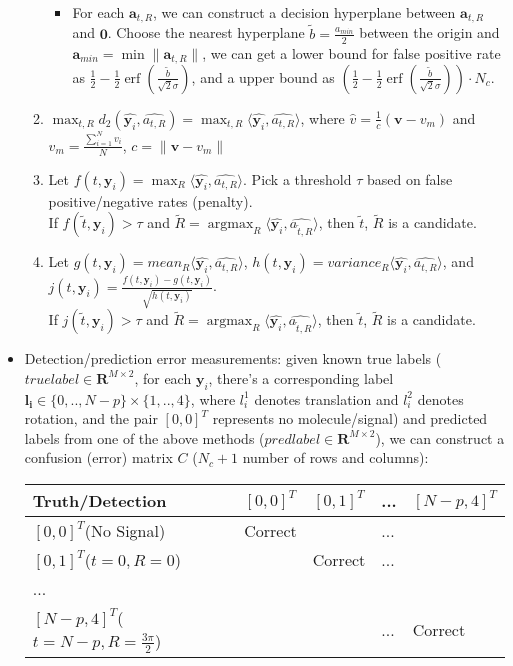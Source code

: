 \documentclass[11pt]{article}
\newcommand{\by}{\boldsymbol{y}}
\DeclareMathOperator*{\argmax}{argmax}
\DeclareMathOperator{\erf}{erf}
\begin{document}
\begin{itemize}
\begin{enumerate}
\begin{itemize}
            \item For each $\mathbf{a}_{t,R}$, we can construct a decision hyperplane between $\mathbf{a}_{t,R}$ and $\mathbf{0}$. Choose the nearest hyperplane $\widetilde{b} = \frac{a_{min}}{2}$ between the origin and $\mathbf{a}_{min} = \min{\lVert  \mathbf{a}_{t,R}\rVert}$, we can get a lower bound for false positive rate as $\frac{1}{2} - \frac{1}{2} \erf(\frac{\widetilde{b}}{\sqrt{2}\sigma})$, and a upper bound as $(\frac{1}{2} - \frac{1}{2} \erf(\frac{\widetilde{b}}{\sqrt{2}\sigma}))\cdot N_c$.
        \end{itemize}
        \item $\max_{t,R} d_{2}(\hat{\by_i}, \hat{a_{t,R}}) = \max_{t,R} \langle \hat{\by_i}, \hat{a_{t,R}} \rangle$, where $\hat{v} = \frac{1}{c}(\mathbf{v} - v_m)$ and $v_m = \frac{\sum_{i=1}^N v_i}{N}$, $c = \lVert \mathbf{v}- v_m\rVert$
        \item Let $f(t,\by_i) = \max_R \langle \hat{\by_i}, \hat{a_{t,R}} \rangle$. Pick a threshold $\tau$ based on false positive/negative rates (penalty).\\
        If $f(\widetilde{t},\by_i) > \tau$ and $\widetilde{R} = \argmax_R \langle \hat{\by_i}, \hat{a_{\widetilde{t},R}} \rangle$, then $\widetilde{t}$, $\widetilde{R}$ is a candidate.
        \item Let $g(t,\by_i) = {mean}_R \langle \hat{\by_i}, \hat{a_{t,R}} \rangle$, $h(t,\by_i) = {variance}_R  \langle \hat{\by_i}, \hat{a_{t,R}} \rangle$, and $j(t,\by_i) = \frac{f(t,\by_i)-g(t,\by_i)}{\sqrt{h(t,\by_i)}}$. \\
        If $j(\widetilde{t},\by_i) > \tau$ and $\widetilde{R} = \argmax_R \langle \hat{\by_i}, \hat{a_{\widetilde{t},R}} \rangle$, then $\widetilde{t}$, $\widetilde{R}$ is a candidate.
    \end{enumerate}
    \item Detection/prediction error measurements: given known true labels ($truelabel \in \mathbf{R}^{M\times 2}$, for each $\by_i$, there's a corresponding label $\mathbf{l_i} \in {\{0,..,N-p\}\times{\{1,..,4\}}}$, where $l_i^1$ denotes translation and $l_i^2$ denotes rotation, and the pair $[0,0]^T$ represents no molecule/signal) and predicted labels from one of the above methods ($predlabel \in \mathbf{R}^{M\times 2}$), we can construct a confusion (error) matrix $C$ ($N_c+1$ number of rows and columns):
    
    \begin{tabular}{l|l|l|l|l}
    Truth/Detection&$[0,0]^T$&$[0,1]^T$&...&$[N-p,4]^T$\\\hline
    $[0,0]^T$(No Signal)&Correct& &...& \\\hline
    $[0,1]^T$($t=0,R=0$)& &Correct&...& \\\hline
    ...& & & & \\\hline
    $[N-p,4]^T$($t=N-p,R=\frac{3\pi}{2}$)& & &...&Correct\\\hline
    \end{tabular}
    

\end{itemize}
\end{document}
